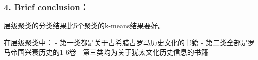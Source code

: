 \documentclass[11pt]{article}
\begin{document}
    \hypertarget{brief-conclusion}{%
\subsubsection{4. Brief conclusion：}\label{brief-conclusion}}

    层级聚类的分类结果比5个聚类的k-means结果要好。

在层级聚类中： - 第一类都是关于古希腊古罗马历史文化的书籍 -
第二类全部是罗马帝国兴衰历史的1-6卷 -
第三类均为关于犹太文化历史信息的书籍


    
    
    
    
\end{document}
